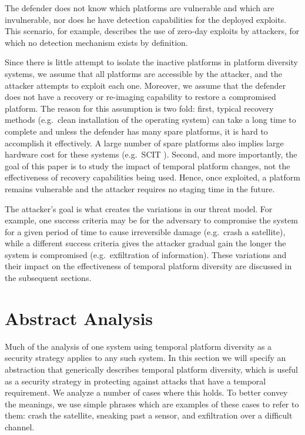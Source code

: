 \documentclass{acm_proc_article-sp}
\begin{document}
The defender does not know which platforms are vulnerable and which are invulnerable, nor does he have detection capabilities for the deployed exploits. This scenario, for example, describes the use of zero-day exploits by attackers, for which no detection mechanism exists by definition.

Since there is little attempt to isolate the inactive platforms in platform diversity systems, we assume that all platforms are accessible by the attacker, and the attacker attempts to exploit each one. Moreover, we assume that the defender does not have a recovery or re-imaging capability to restore a compromised platform. The reason for this assumption is two fold: first, typical recovery methods (e.g.~clean installation of the operating system) can take a long time to complete and unless the defender has many spare platforms, it is hard to accomplish it effectively. A large number of spare platforms also implies large hardware cost for these systems (e.g.~SCIT \cite{scit}). Second, and more importantly, the goal of this paper is to study the impact of temporal platform changes, not the effectiveness of recovery capabilities being used. Hence, once exploited, a platform remains vulnerable and the attacker requires no staging time in the future.

The attacker's goal is what creates the variations in our threat model. For example, one success criteria may be for the adversary to compromise the system for a given period of time to cause irreversible damage (e.g.~crash a satellite), while a different success criteria gives the attacker gradual gain the longer the system is compromised (e.g.~exfiltration of information). These variations and their impact on the effectiveness of temporal platform diversity are discussed in the subsequent sections.

\section{Abstract Analysis}
\label{AA}

Much of the analysis of one system using temporal platform diversity
as a security strategy applies to any such system. In this section
we will specify an abstraction that generically describes temporal
platform diversity, which is useful as a security strategy in protecting against attacks that have a temporal requirement. We analyze a number of cases where this holds. To better convey the meanings, 
we use simple phrases which are examples of these cases to refer to them: 
crash the satellite, sneaking past a sensor, and  exfiltration over a difficult channel.
\end{document}

